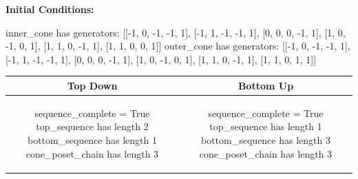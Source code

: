 \documentclass[10pt]{article}
\begin{document}
\textbf{Initial Conditions:}
\begin{SAGE}
inner_cone has generators: 
[[-1, 0, -1, -1, 1], [-1, 1, -1, -1, 1], [0, 0, 0, -1, 1], [1, 0, -1, 0, 1], [1, 1, 0, -1, 1], [1, 1, 0, 0, 1]]
outer_cone has generators: 
[[-1, 0, -1, -1, 1], [-1, 1, -1, -1, 1], [0, 0, 0, -1, 1], [1, 0, -1, 0, 1], [1, 1, 0, -1, 1], [1, 1, 0, 1, 1]]

\end{SAGE}
\begin{tabular}{c|c}
\textbf{Top Down} & \textbf{Bottom Up} \\ \hline  
\begin{SAGE}
sequence_complete = True
top_sequence has length 2
bottom_sequence has length 1
cone_poset_chain has length 3
\end{SAGE} 
&
\begin{SAGE}
sequence_complete = True
top_sequence has length 1
bottom_sequence has length 3
cone_poset_chain has length 3
\end{SAGE} 
\\ \hline


\end{tabular}
\end{document}
